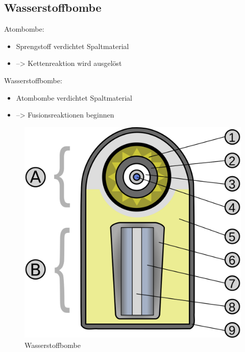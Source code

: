 \documentclass[10pt,a4paper, ngerman]{beamer}
\begin{document}
\subsection{Wasserstoffbombe}
\begin{frame}{\subsecname}{\secname}
\LARGE Atombombe: \normalsize
\begin{itemize}
\item Sprengstoff verdichtet Spaltmaterial
\item --> Kettenreaktion wird ausgelöst 
\end{itemize}
\pause
\LARGE Wasserstoffbombe: \normalsize
\begin{itemize}
\item Atombombe verdichtet Spaltmaterial
\item --> Fusionsreaktionen beginnen
\end{itemize}
\end{frame}

\begin{frame}{\subsecname}{\secname}
\begin{figure}
\centering
\includegraphics[height=0.8\textheight]{h-bomb}
\caption{Wasserstoffbombe}
\label{fig:h-bomb}
\end{figure}
\end{frame}
\end{document}
